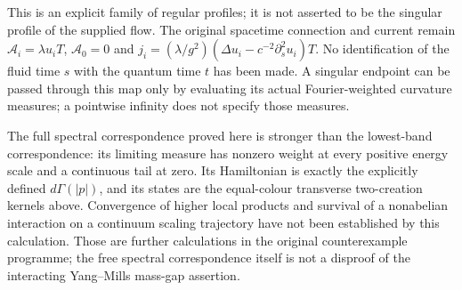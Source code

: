 This is an explicit family of regular profiles; it is not asserted to be
the singular profile of the supplied flow. The original spacetime
connection and current remain \(\mathcal A_i=\lambda u_iT\),
\(\mathcal A_0=0\) and
\(j_i=(\lambda/g^2)(\Delta u_i-c^{-2}\partial_s^2u_i)T\). No
identification of the fluid time \(s\) with the quantum time \(t\) has
been made. A singular endpoint can be passed through this map only by
evaluating its actual Fourier-weighted curvature measures; a pointwise
infinity does not specify those measures.

The full spectral correspondence proved here is stronger than the
lowest-band correspondence: its limiting measure has nonzero weight at
every positive energy scale and a continuous tail at zero. Its
Hamiltonian is exactly the explicitly defined \(d\Gamma(|p|)\), and its
states are the equal-colour transverse two-creation kernels above.
Convergence of higher local products and survival of a nonabelian
interaction on a continuum scaling trajectory have not been established
by this calculation. Those are further calculations in the original
counterexample programme; the free spectral correspondence itself is not
a disproof of the interacting Yang--Mills mass-gap assertion.
